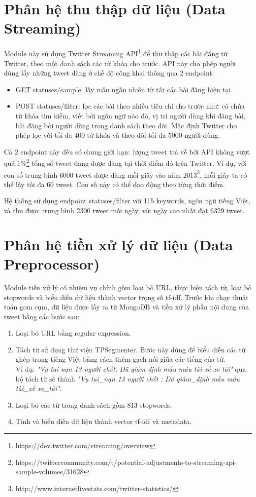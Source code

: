 \section{Phân hệ thu thập dữ liệu (Data Streaming)}
Module này sử dụng Twitter Streaming API\footnote{https://dev.twitter.com/streaming/overview} để thu thập các bài đăng từ Twitter, theo một danh sách các từ khóa cho trước. API này cho phép người dùng lấy những tweet đăng ở chế độ công khai thông qua 2 endpoint:
	\begin{itemize}
		\item GET statuses/sample: lấy mẫu ngẫu nhiên từ tất các bài đăng hiện tại.
		\item POST statuses/filter: lọc các bài theo nhiều tiêu chí cho trước như: có chứa từ khóa tìm kiếm, viết bởi ngôn ngữ nào đó, vị trí người dùng khi đăng bài, bài đăng bởi người dùng trong danh sách theo dõi. Mặc định Twitter cho phép lọc với tối đa 400 từ khóa và theo dõi tối đa 5000 người dùng.
	\end{itemize}
Cả 2 endpoint này đều có chung giới hạn: lượng tweet trả về bởi API không vượt quá 1\%\footnote{https://twittercommunity.com/t/potential-adjustments-to-streaming-api-sample-volumes/31628} tổng số tweet đang được đăng tại thời điểm đó trên Twitter. Ví dụ, với con số trung bình 6000 tweet được đăng mỗi giây vào năm 2013\footnote{http://www.internetlivestats.com/twitter-statistics/}, mỗi giây ta có thể lấy tối đa 60 tweet. Con số này có thể dao động theo từng thời điểm.

Hệ thống sử dụng endpoint statuses/filter với 115 keywords, ngôn ngữ tiếng Việt, và thu được trung bình 2300 tweet mỗi ngày, với ngày cao nhất đạt 6329 tweet. 

\section{Phân hệ tiền xử lý dữ liệu (Data Preprocessor)}
Module tiền xử lý có nhiệm vụ chính gồm loại bỏ URL, thực hiện tách từ, loại bỏ stopwords và biểu diễn dữ liệu thành vector trọng số tf-idf. Trước khi chạy thuật toán gom cụm, dữ liệu được lấy ra từ MongoDB và tiền xử lý phần nội dung của tweet bằng các bước sau:
	\begin{enumerate}
		\item Loại bỏ URL bằng regular expression.
		\item Tách từ sử dụng thư viện TPSegmenter. Bước này dùng để biểu diễn các từ ghép trong tiếng Việt bằng cách thêm gạch nối giữa các tiếng của từ.\\
		Ví dụ: \textit{"Vụ tai nạn 13 người chết: Đã giám định mẫu máu tài xế xe tải"} qua bộ tách từ sẽ thành \textit{"Vụ tai\_nạn 13 người chết : Đã giám\_định mẫu máu tài\_xế xe\_tải"}.
		\item Loại bỏ các từ trong danh sách gồm 813 stopwords.
		\item Tính và biểu diễn dữ liệu thành vector tf-idf và metadata.
	\end{enumerate}

